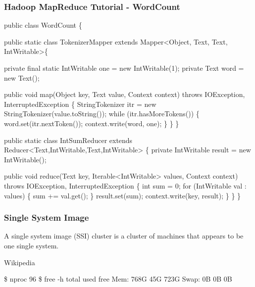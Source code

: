 \documentclass{beamer}
\begin{document}
\begin{frame}[fragile]
\frametitle{Hadoop MapReduce Tutorial - WordCount}
\begin{semiverbatim}
\tiny public class WordCount \{

  public static class TokenizerMapper
       extends Mapper<Object, Text, Text, IntWritable>\{

    private final static IntWritable one = new IntWritable(1);
    private Text word = new Text();

    public void map(Object key, Text value, Context context)
                     throws IOException, InterruptedException \{
      StringTokenizer itr = new StringTokenizer(value.toString());
      while (itr.hasMoreTokens()) \{
        word.set(itr.nextToken());
        context.write(word, one);
      \}
    \}
  \}

  public static class IntSumReducer
       extends Reducer<Text,IntWritable,Text,IntWritable> \{
    private IntWritable result = new IntWritable();

    public void reduce(Text key, Iterable<IntWritable> values, Context context)
                        throws IOException, InterruptedException \{
      int sum = 0;
      for (IntWritable val : values) \{
        sum += val.get();
      \}
      result.set(sum);
      context.write(key, result);
    \}
  \}
\}
\end{semiverbatim}
\end{frame}

\begin{frame}[fragile]
\frametitle{Single System Image}
\begin{definition}
A single system image (SSI) cluster is a cluster of machines that appears to be one single system.

\hfill Wikipedia
\end{definition}
\begin{center}
\end{center}
\begin{semiverbatim}
\$ nproc
96
\$ free -h
              total        used        free
Mem:           768G         45G        723G
Swap:            0B          0B          0B

\end{semiverbatim}
\end{frame}
\end{document}
